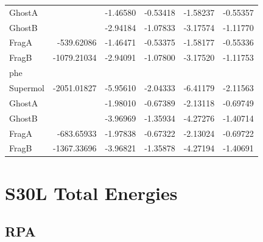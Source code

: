 \documentclass[journal=jctcce,manuscript=article]{achemso}
\begin{document}
\begin{spacing}{1}
\begin{longtable}[H]{lRRRRR}
    GhostA   &                      & -1.46580      & -0.53418      & -1.58237      & -0.55357      \\
    GhostB   &                      & -2.94184      & -1.07833      & -3.17574      & -1.11770      \\
    FragA    & -539.62086           & -1.46471      & -0.53375      & -1.58177      & -0.55336      \\
    FragB    & -1079.21034          & -2.94091      & -1.07800      & -3.17520      & -1.11753      \\
    phe      &                      &               &               &               &               \\
    Supermol & -2051.01827          & -5.95610      & -2.04333      & -6.41179      & -2.11563      \\
    GhostA   &                      & -1.98010      & -0.67389      & -2.13118      & -0.69749      \\
    GhostB   &                      & -3.96969      & -1.35934      & -4.27276      & -1.40714      \\
    FragA    & -683.65933           & -1.97838      & -0.67322      & -2.13024      & -0.69722      \\
    FragB    & -1367.33696          & -3.96821      & -1.35878      & -4.27194      & -1.40691     
\end{longtable}

\section{S30L Total Energies}

\subsection{RPA}


\end{spacing}
\end{document}
